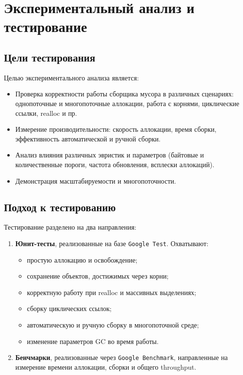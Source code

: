 \section{Экспериментальный анализ и тестирование}

\subsection{Цели тестирования}

Целью экспериментального анализа является:
\begin{itemize}
    \item Проверка корректности работы сборщика мусора в различных сценариях: однопоточные и многопоточные аллокации, работа с корнями, циклические ссылки, realloc и пр.
    \item Измерение производительности: скорость аллокации, время сборки, эффективность автоматической и ручной сборки.
    \item Анализ влияния различных эвристик и параметров (байтовые и количественные пороги, частота обновления, всплески аллокаций).
    \item Демонстрация масштабируемости и многопоточности.
\end{itemize}

\subsection{Подход к тестированию}

Тестирование разделено на два направления:

\begin{enumerate}[label=\arabic*.]
    \item \textbf{Юнит-тесты}, реализованные на базе \texttt{Google Test}. Охватывают:
    \begin{itemize}
        \item простую аллокацию и освобождение;
        \item сохранение объектов, достижимых через корни;
        \item корректную работу при realloc и массивных выделениях;
        \item сборку циклических ссылок;
        \item автоматическую и ручную сборку в многопоточной среде;
        \item изменение параметров GC во время работы.
    \end{itemize}

    \item \textbf{Бенчмарки}, реализованные через \texttt{Google Benchmark}, направленные на измерение времени аллокации, сборки и общего throughput.
\end{enumerate}


